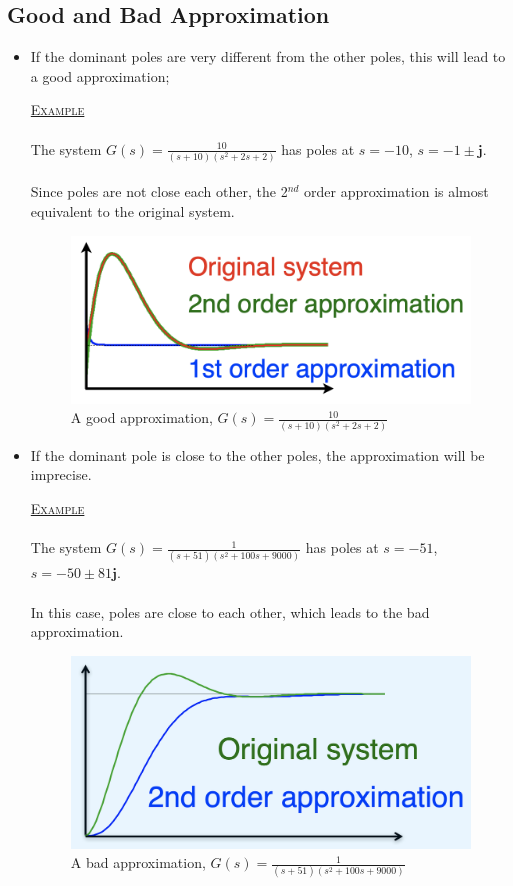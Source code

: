 \documentclass[12pt,a4paper]{article}
\begin{document}
\subsection{Good and Bad Approximation}
\begin{itemize}
\item If the dominant poles are very different from the other poles, this will lead to a good approximation;
\begin{tcolorbox}[breakable]
\textsc{\underline{Example}}\\\\
The system $G(s)=\frac{10}{(s+10)(s^{2}+2s+2)}$ has poles at $s = -10$, $s = -1 \pm \mathbf{j}$. \\\\Since poles are not close each other, the 2$^{nd}$ order approximation is almost equivalent to the original system.
\begin{figure}[H] \centering 
\includegraphics[width=.4\textwidth]{images/good_approx.png}
\caption{A good approximation, $G(s)=\frac{10}{(s+10)(s^{2}+2s+2)}$}
\end{figure}
\end{tcolorbox}

\item If the dominant pole is close to the other poles, the approximation will be imprecise.
\begin{tcolorbox}[breakable]
\textsc{\underline{Example}}\\\\
The system $G(s)=\frac{1}{(s+51)(s^{2}+100s+9000)}$ has poles at $s = -51$, $s = -50 \pm 81\mathbf{j}$.\\\\ In this case, poles are close to each other, which leads to the bad approximation.
\begin{figure}[H] \centering 
\includegraphics[width=.4\textwidth]{images/bad_approx.png}
\caption{A bad approximation, $G(s)=\frac{1}{(s+51)(s^{2}+100s+9000)}$}
\end{figure}
\end{tcolorbox}
\end{itemize}
\end{document}
